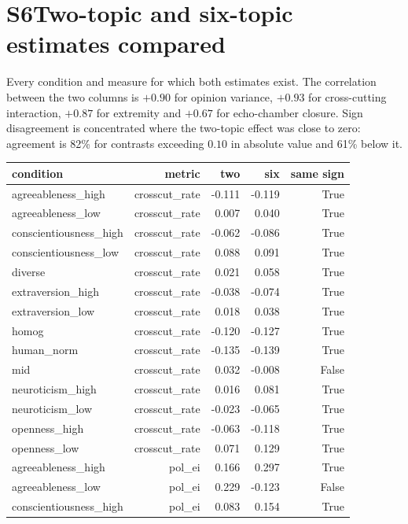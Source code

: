 \documentclass[11pt]{article}
\begin{document}
\section*{S6\quad Two-topic and six-topic estimates compared}
Every condition and measure for which both estimates exist. The correlation between the two columns is $+0.90$ for opinion variance, $+0.93$ for cross-cutting interaction, $+0.87$ for extremity and $+0.67$ for echo-chamber closure. Sign disagreement is concentrated where the two-topic effect was close to zero: agreement is 82\% for contrasts exceeding $0.10$ in absolute value and 61\% below it.
\scriptsize
\setlength{\tabcolsep}{2.5pt}
\begin{longtable}{@{}lrrrr@{}}
\toprule
condition & metric & two & six & same sign \\
\midrule
\endhead
agreeableness\_high & crosscut\_rate & -0.111 & -0.119 & True \\
agreeableness\_low & crosscut\_rate & 0.007 & 0.040 & True \\
conscientiousness\_high & crosscut\_rate & -0.062 & -0.086 & True \\
conscientiousness\_low & crosscut\_rate & 0.088 & 0.091 & True \\
diverse & crosscut\_rate & 0.021 & 0.058 & True \\
extraversion\_high & crosscut\_rate & -0.038 & -0.074 & True \\
extraversion\_low & crosscut\_rate & 0.018 & 0.038 & True \\
homog & crosscut\_rate & -0.120 & -0.127 & True \\
human\_norm & crosscut\_rate & -0.135 & -0.139 & True \\
mid & crosscut\_rate & 0.032 & -0.008 & False \\
neuroticism\_high & crosscut\_rate & 0.016 & 0.081 & True \\
neuroticism\_low & crosscut\_rate & -0.023 & -0.065 & True \\
openness\_high & crosscut\_rate & -0.063 & -0.118 & True \\
openness\_low & crosscut\_rate & 0.071 & 0.129 & True \\
agreeableness\_high & pol\_ei & 0.166 & 0.297 & True \\
agreeableness\_low & pol\_ei & 0.229 & -0.123 & False \\
conscientiousness\_high & pol\_ei & 0.083 & 0.154 & True \\

\end{longtable}
\end{document}

